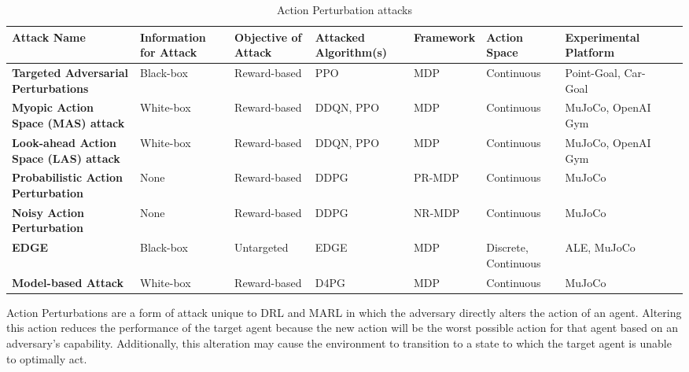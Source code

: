 \documentclass[conference,compsoc]{IEEEtran}
\begin{document}
\begin{table}[ht]
\centering
\caption{Action Perturbation attacks}
\begin{tabulary}{1.0\textwidth}{LLLLLLLLL} 
\hline
\textbf{Attack Name}                            & \textbf{Information for Attack} & \textbf{Objective of Attack}   & \textbf{Attacked Algorithm(s)} & \textbf{Framework} & \textbf{Action Space} & \textbf{Experimental Platform}  \\ 
\hline
\textbf{Targeted Adversarial Perturbations} \cite{lee_query-based_2021}       & Black-box                       & Reward-based & PPO                         & MDP            & Continuous            & Point-Goal, Car-Goal            \\ 
\textbf{\textbf{Myopic Action Space (MAS) attack}} \cite{lee_spatiotemporally_2020} & White-box                       & Reward-based         & DDQN, PPO                   & MDP            & Continuous            & MuJoCo, OpenAI Gym              \\ 
\textbf{Look-ahead Action Space (LAS) attack} \cite{lee_spatiotemporally_2020}     & White-box                       & Reward-based         & DDQN, PPO                   & MDP            & Continuous            & MuJoCo, OpenAI Gym              \\ 
\textbf{Probabilistic Action Perturbation} \cite{tessler_action_2019}        & None                            & Reward-based         & DDPG                        & PR-MDP        & Continuous            & MuJoCo                          \\ 
\textbf{\textbf{Noisy Action Perturbation}} \cite{tessler_action_2019}       & None                            & Reward-based         & DDPG                        & NR-MDP         & Continuous            & MuJoCo                          \\ 
\textbf{EDGE} \cite{guo_edge_2021}                                     & Black-box                       & Untargeted                  & EDGE                        & MDP            & Discrete, Continuous  & ALE, MuJoCo                     \\
\textbf{Model-based Attack \cite{weng_toward_2020}} & White-box & Reward-based & D4PG & MDP & Continuous & MuJoCo \\
\hline
\end{tabulary}
\label{tab:action_attacks}
\end{table}

Action Perturbations are a form of attack unique to DRL and MARL in which the adversary directly alters the action of an agent. Altering this action reduces the performance of the target agent because the new action will be the worst possible action for that agent based on an adversary's capability. Additionally, this alteration may cause the environment to transition to a state to which the target agent is unable to optimally act.
\end{document}
